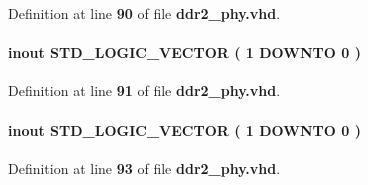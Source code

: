 Definition at line {\bf 90} of file {\bf ddr2\+\_\+phy.\+vhd}.

\paragraph[{mem\+\_\+dqs}]{ {\bfseries \textcolor{keywordflow}{inout}\textcolor{vhdlchar}{ }} {\bfseries \textcolor{comment}{S\+T\+D\+\_\+\+L\+O\+G\+I\+C\+\_\+\+V\+E\+C\+T\+OR}\textcolor{vhdlchar}{ }\textcolor{vhdlchar}{(}\textcolor{vhdlchar}{ }\textcolor{vhdlchar}{ } \textcolor{vhdldigit}{1} \textcolor{vhdlchar}{ }\textcolor{keywordflow}{D\+O\+W\+N\+TO}\textcolor{vhdlchar}{ }\textcolor{vhdlchar}{ } \textcolor{vhdldigit}{0} \textcolor{vhdlchar}{ }\textcolor{vhdlchar}{)}\textcolor{vhdlchar}{ }} \hspace{0.3cm}{\ttfamily [Port]}}\label{classddr2__phy_a4dc9f36564489295eb0ba3ba315de770}


Definition at line {\bf 91} of file {\bf ddr2\+\_\+phy.\+vhd}.

\paragraph[{mem\+\_\+dqs\+\_\+n}]{ {\bfseries \textcolor{keywordflow}{inout}\textcolor{vhdlchar}{ }} {\bfseries \textcolor{comment}{S\+T\+D\+\_\+\+L\+O\+G\+I\+C\+\_\+\+V\+E\+C\+T\+OR}\textcolor{vhdlchar}{ }\textcolor{vhdlchar}{(}\textcolor{vhdlchar}{ }\textcolor{vhdlchar}{ } \textcolor{vhdldigit}{1} \textcolor{vhdlchar}{ }\textcolor{keywordflow}{D\+O\+W\+N\+TO}\textcolor{vhdlchar}{ }\textcolor{vhdlchar}{ } \textcolor{vhdldigit}{0} \textcolor{vhdlchar}{ }\textcolor{vhdlchar}{)}\textcolor{vhdlchar}{ }} \hspace{0.3cm}{\ttfamily [Port]}}\label{classddr2__phy_a8f6a979c32972083c02a2c87725f02fd}


Definition at line {\bf 93} of file {\bf ddr2\+\_\+phy.\+vhd}.

